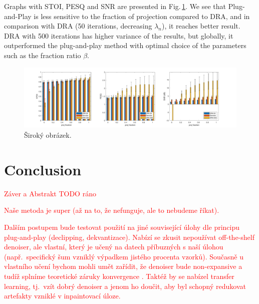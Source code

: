 \documentclass[conference]{IEEEtran}
\newcommand{\todo}[1]{\textcolor{red}{#1}}
\begin{document}
Graphs with STOI, PESQ and SNR are presented in Fig.\,\ref{fig:final2witherrors}.
We see that Plug-and-Play is less sensitive to the fraction of projection compared to DRA,
and in comparison with DRA (50 iterations, decreasing $\lambda_n$), it reaches better result.
DRA with 500 iterations has higher variance of the results, but globally, it outperformed the plug-and-play method with optimal choice of the parameters such as the fraction ratio $\beta$.



\begin{figure}
	\includegraphics[width=\linewidth]{figures/final2_with_errors}
	\caption{Široký obrázek.}
	\label{fig:final2witherrors}
\end{figure}

\section{Conclusion}
\label{sec:conclusion}

\todo{Záver a Abstrakt TODO ráno}

\todo{Naše metoda je super (až na to, že nefunguje, ale to nebudeme říkat).}

\todo{Dalším postupem bude testovat použití na jiné související úlohy dle principu plug-and-play (declipping, dekvantizace). Nabízí se zkusit nepoužívat off-the-shelf denoiser, ale vlastní, který je učený na datech příbuzných s naší úlohou (např.\ specifický šum vzniklý výpadkem jistého procenta vzorků). Současně u vlastního učení bychom mohli umět zařídit, že denoiser bude non-expansive a tudíž splníme teoretické záruky konvergence \cite{Venkatakrishnan2013,Chan2016}. Taktéž by se nabízel transfer learning, tj.\ vzít dobrý denoiser a jenom ho doučit, aby byl schopný redukovat artefakty vzniklé v inpaintovací úloze.}
\end{document}
